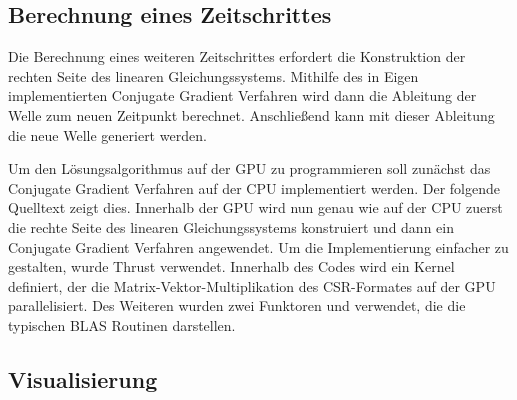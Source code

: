 \documentclass[crop=false,10pt,ngerman]{standalone}
\begin{document}
    \subsection{Berechnung eines Zeitschrittes} %
    \label{sub:konstruktion_des_linearen_gleichungssystems}
      Die Berechnung eines weiteren Zeitschrittes erfordert die Konstruktion der rechten Seite des linearen Gleichungssystems.
      Mithilfe des in Eigen implementierten Conjugate Gradient Verfahren wird dann die Ableitung der Welle zum neuen Zeitpunkt berechnet.
      Anschließend kann mit dieser Ableitung die neue Welle generiert werden.

      Um den Lösungsalgorithmus auf der GPU zu programmieren soll zunächst das Conjugate Gradient Verfahren auf der CPU implementiert werden.
      Der folgende Quelltext zeigt dies.
      Innerhalb der GPU wird nun genau wie auf der CPU zuerst die rechte Seite des linearen Gleichungssystems konstruiert und dann ein Conjugate Gradient Verfahren angewendet.
      Um die Implementierung einfacher zu gestalten, wurde Thrust verwendet.
      Innerhalb des Codes wird ein Kernel definiert, der die Matrix-Vektor-Multiplikation des CSR-Formates auf der GPU parallelisiert.
      Des Weiteren wurden zwei Funktoren  und  verwendet, die die typischen BLAS Routinen darstellen.

    \subsection{Visualisierung} %
    \label{sub:visualisierung}
\end{document}
